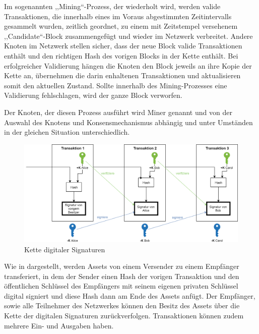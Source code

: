     Im sogenannten ,,Mining``-Prozess, der wiederholt wird, werden valide Transaktionen, die innerhalb eines im Voraus abgestimmten Zeitintervalls gesammelt wurden, zeitlich geordnet, zu einem mit Zeitstempel versehenem ,,Candidate``-Block zusammengefügt und wieder im Netzwerk verbreitet. 
    Andere Knoten im Netzwerk stellen sicher, dass der neue Block valide Transaktionen enthält und den richtigen Hash des vorigen Blocks in der Kette enthält. 
    Bei erfolgreicher Validierung hängen die Knoten den Block jeweils an ihre Kopie der Kette an, übernehmen die darin enhaltenen Transaktionen und aktualisieren somit den aktuellen Zustand. 
    Sollte innerhalb des Mining-Prozesses eine Validierung fehlschlagen, wird der ganze Block verworfen.
    
    Der Knoten, der diesen Prozess ausführt wird Miner genannt und von der Auswahl des Knotens und Konsensmechanismus abhängig und unter Umständen in der gleichen Situation unterschiedlich.\cite{Christidis2016}
    
    \begin{figure}[H]
    	\centering
    	\includegraphics[width=\textwidth]{graphics/transaction.png}
    	\caption[Kette digitaler Signaturen]{Kette digitaler Signaturen\cite{Nakamoto2008}}
    	\label{fig:txio}
    \end{figure}
    
    Wie in  dargestellt, werden Assets von einem Versender zu einem Empfänger transferiert, in dem der Sender einen Hash der vorigen Transaktion und den öffentlichen Schlüssel des Empfängers mit seinem eigenen privaten Schlüssel digital signiert und diese Hash dann am Ende des Assets anfügt.
    Der Empfänger, sowie alle Teilnehmer des Netzwerkes können den Besitz des Assets über die Kette der digitalen Signaturen zurückverfolgen.
    Transaktionen können zudem mehrere Ein- und Ausgaben haben.\cite{Nakamoto2008}
    
